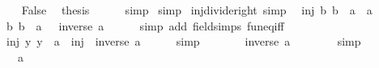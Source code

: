 \begin{isabellebody}
\isanewline
\ \ \isamarkupfalse%
\ False\ \isamarkupfalse%
\ {\isacharquery}{\kern0pt}thesis\isanewline
\ \ \ \ \isamarkupfalse%
\ simp\isanewline
{}\isamarkupfalse%
\ simp%
\endisatagproof
{\isafoldproof}%
%
\isadelimproof
\isanewline
%
\endisadelimproof
\isanewline
{}\isamarkupfalse%
\ inj{\isacharunderscore}{\kern0pt}divide{\isacharunderscore}{\kern0pt}right\ {\isacharbrackleft}{\kern0pt}simp{\isacharbrackright}{\kern0pt}{\isacharcolon}{\kern0pt}\isanewline
\ \ {\isachardoublequoteopen}inj\ {\isacharparenleft}{\kern0pt}{\isasymlambda}b{\isachardot}{\kern0pt}\ b\ {\isacharslash}{\kern0pt}\ a{\isacharparenright}{\kern0pt}\ {\isasymlongleftrightarrow}\ a\ {\isasymnoteq}\ {}{\isachardoublequoteclose}\isanewline
%
\isadelimproof
%
\endisadelimproof
%
\isatagproof
{}\isamarkupfalse%
\ {\isacharminus}{\kern0pt}\isanewline
\ \ \isamarkupfalse%
\ {\isachardoublequoteopen}{\isacharparenleft}{\kern0pt}{\isasymlambda}b{\isachardot}{\kern0pt}\ b\ {\isacharslash}{\kern0pt}\ a{\isacharparenright}{\kern0pt}\ {\isacharequal}{\kern0pt}\ {\isacharparenleft}{\kern0pt}{\isacharasterisk}{\kern0pt}{\isacharparenright}{\kern0pt}\ {\isacharparenleft}{\kern0pt}inverse\ a{\isacharparenright}{\kern0pt}{\isachardoublequoteclose}\isanewline
\ \ \ \ \isamarkupfalse%
\ {\isacharparenleft}{\kern0pt}simp\ add{\isacharcolon}{\kern0pt}\ field{\isacharunderscore}{\kern0pt}simps\ fun{\isacharunderscore}{\kern0pt}eq{\isacharunderscore}{\kern0pt}iff{\isacharparenright}{\kern0pt}\isanewline
\ \ \isamarkupfalse%
\ \isamarkupfalse%
\ {\isachardoublequoteopen}inj\ {\isacharparenleft}{\kern0pt}{\isasymlambda}y{\isachardot}{\kern0pt}\ y\ {\isacharslash}{\kern0pt}\ a{\isacharparenright}{\kern0pt}\ {\isasymlongleftrightarrow}\ inj\ {\isacharparenleft}{\kern0pt}{\isacharparenleft}{\kern0pt}{\isacharasterisk}{\kern0pt}{\isacharparenright}{\kern0pt}\ {\isacharparenleft}{\kern0pt}inverse\ a{\isacharparenright}{\kern0pt}{\isacharparenright}{\kern0pt}{\isachardoublequoteclose}\isanewline
\ \ \ \ \isamarkupfalse%
\ simp\isanewline
\ \ \isamarkupfalse%
\ \isamarkupfalse%
\ {\isachardoublequoteopen}{\isasymdots}\ {\isasymlongleftrightarrow}\ inverse\ a\ {\isasymnoteq}\ {}{\isachardoublequoteclose}\isanewline
\ \ \ \ \isamarkupfalse%
\ simp\isanewline
\ \ \isamarkupfalse%
\ \isamarkupfalse%
\ {\isachardoublequoteopen}{\isasymdots}\ {\isasymlongleftrightarrow}\ a\ {\isasymnoteq}\ {}{\isachardoublequoteclose}\isanewline

\end{isabellebody}
